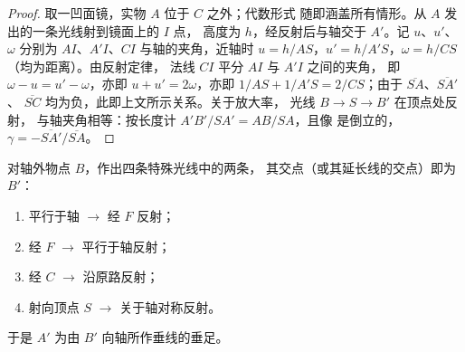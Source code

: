 \begin{proof}
取一凹面镜，实物 $A$ 位于 $C$ 之外；代数形式
随即涵盖所有情形。从 $A$ 发出的一条光线射到镜面上的 $I$ 点，
高度为 $h$，经反射后与轴交于 $A'$。记 $u$、$u'$、$\omega$
分别为 $AI$、$A'I$、$CI$ 与轴的夹角，近轴时
$u = h/AS$，$u' = h/A'S$，$\omega = h/CS$（均为距离）。由反射定律，
法线 $CI$ 平分 $AI$ 与 $A'I$ 之间的夹角，
即 $\omega - u = u' - \omega$，亦即 $u + u' = 2\omega$，亦即
$1/AS + 1/A'S = 2/CS$；由于 $\overline{SA}$、$\overline{SA'}$、
$\overline{SC}$ 均为负，此即上文所示关系。关于放大率，
光线 $B \to S \to B'$ 在顶点处反射，
与轴夹角相等：按长度计 $A'B'/SA' = AB/SA$，且像
是倒立的，$\gamma = -\overline{SA'}/\overline{SA}$。
\end{proof}

\begin{method}[在镜中作像]\label{met:b1:mirrors-thin-lenses:mirrorrays}
对轴外物点 $B$，作出四条特殊光线中的两条，
其交点（或其延长线的交点）即为 $B'$：
\begin{enumerate}
  \item 平行于轴 $\to$ 经 $F$ 反射；
  \item 经 $F$ $\to$ 平行于轴反射；
  \item 经 $C$ $\to$ 沿原路反射；
  \item 射向顶点 $S$ $\to$ 关于轴对称反射。
\end{enumerate}
于是 $A'$ 为由 $B'$ 向轴所作垂线的垂足。
\end{method}

